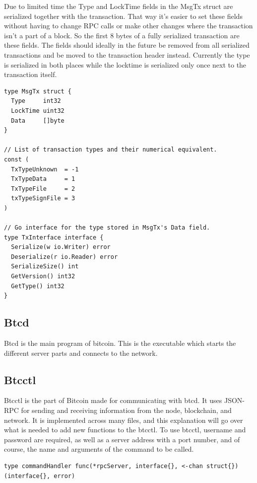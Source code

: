 \documentclass[11pt]{article}
\begin{document}
Due to limited time the Type and LockTime fields in the MsgTx struct are serialized together with the transaction. That way it's easier to set these fields without having to change RPC calls or make other changes where the transaction isn't a part of a block. So the first 8 bytes of a fully serialized transaction are these fields. The fields should ideally in the future be removed from all serialized transactions and be moved to the transaction header instead. Currently the type is serialized in both places while the locktime is serialized only once next to the transaction itself.

\begin{lstlisting}[float=h!,caption={Transaction structure},label=lst:transaction_structs]
type MsgTx struct {
  Type     int32
  LockTime uint32
  Data     []byte
}

// List of transaction types and their numerical equivalent.
const (
  TxTypeUnknown  = -1
  TxTypeData     = 1
  TxTypeFile     = 2
  txTypeSignFile = 3
)

// Go interface for the type stored in MsgTx's Data field.
type TxInterface interface {
  Serialize(w io.Writer) error
  Deserialize(r io.Reader) error
  SerializeSize() int
  GetVersion() int32
  GetType() int32
}
\end{lstlisting}


\subsection{Btcd}
Btcd is the main program of bitcoin. This is the executable which starts the different server parts and connects to the network. 

\subsection{Btcctl}
Btcctl is the part of Bitcoin made for communicating with btcd. It uses JSON-RPC for sending and receiving information from the node, blockchain, and network. It is implemented across many files, and this explanation will go over what is needed to add new functions to the btcctl. To use btcctl, username and password are required, as well as a server address with a port number, and of course, the name and arguments of the command to be called. 

\begin{lstlisting}[float=h!,caption={Command handler type},label=lst:cmdHandler]
type commandHandler func(*rpcServer, interface{}, <-chan struct{}) (interface{}, error)
\end{lstlisting}
\end{document}
